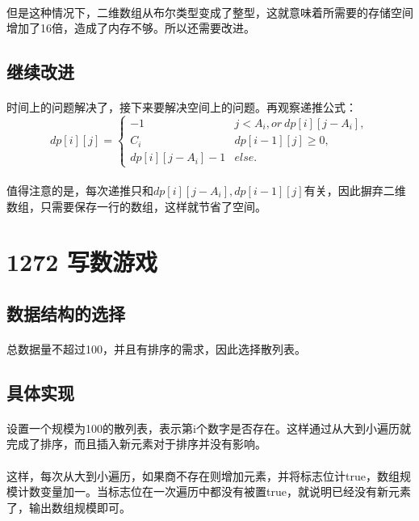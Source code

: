 \documentclass[UTF-8, 12pt]{ctexart}
\begin{document}
    \paragraph{}
    但是这种情况下，二维数组从布尔类型变成了整型，这就意味着所需要的存储空间增加了16倍，造成了内存不够。所以还需要改进。

    \subsection{继续改进}
    \paragraph{}
    时间上的问题解决了，接下来要解决空间上的问题。再观察递推公式：
    \[dp[i][j]=\left\{\begin{array}{lll}
        -1              & j<A_i, or \ dp[i][j-A_i],\\
        C_i             & dp[i-1][j] \ge 0, \\
        dp[i][j-A_i] - 1& else.
    \end{array}\right.\]

    \paragraph{}
    值得注意的是，每次递推只和$dp[i][j-A_i],dp[i-1][j]$有关，因此摒弃二维数组，只需要保存一行的数组，这样就节省了空间。

    \section{1272 写数游戏}
    \subsection{数据结构的选择}
    \paragraph{}
    总数据量不超过100，并且有排序的需求，因此选择散列表。

    \subsection{具体实现}
    \paragraph{}
    设置一个规模为100的散列表，表示第i个数字是否存在。这样通过从大到小遍历就完成了排序，而且插入新元素对于排序并没有影响。
    \paragraph{}
    这样，每次从大到小遍历，如果商不存在则增加元素，并将标志位计true，数组规模计数变量加一。当标志位在一次遍历中都没有被置true，就说明已经没有新元素了，输出数组规模即可。
\end{document}
